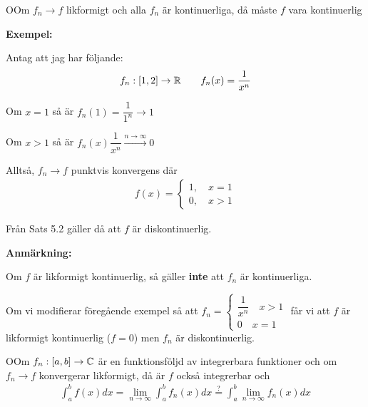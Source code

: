 \par\bigskip
\begin{theo}
  OOm $f_n\to f$ likformigt och alla $f_n$ är kontinuerliga, då måste $f$ vara kontinuerlig
\end{theo}
\newpage
\noindent\textbf{Exempel:}\par
\noindent Antag att jag har följande:
\begin{equation*}
  \begin{gathered}
    f_n:[1,2]\to\mathbb{R}\qquad f_n(x) = \dfrac{1}{x^n}
  \end{gathered}
\end{equation*}
\par\bigskip
\noindent Om $x = 1$ så är $f_n(1) = \dfrac{1}{1^n} \to 1$\par
\noindent Om $x>1$ så är $f_n(x) \dfrac{1}{x^n}\stackrel{n\to\infty}{\to}0$
\par\bigskip
\noindent Alltså, $f_n\to f$ punktvis konvergens där
\begin{equation*}
  \begin{gathered}
    f(x) = 
    \begin{cases*}
      1,\quad x=1\\
      0,\quad x>1
    \end{cases*}
  \end{gathered}
\end{equation*}
\par\bigskip
\noindent Från Sats 5.2 gäller då att $f$ är diskontinuerlig.
\par\bigskip
\noindent\textbf{Anmärkning:}\par
\noindent Om $f$ är likformigt kontinuerlig, så gäller \textbf{inte} att $f_n$ är kontinuerliga.
\par\bigskip
\noindent Om vi modifierar föregående exempel så att $f_n = \begin{cases}\dfrac{1}{x^n}\quad x>1\\0\quad x=1\end{cases}$ får vi att $f$ är likformigt kontinuerlig ($f = 0$) men $f_n$ är diskontinuerlig.
\par\bigskip
\begin{theo}
  OOm $f_n:[a,b]\to\mathbb{C}$ är en funktionsföljd av integrerbara funktioner och om $f_n\to f$ konvergerar likformigt, då är $f$ också integrerbar och
  \begin{equation*}
    \begin{gathered}
      \int_{a}^{b}f(x)dx = \lim_{n\to\infty}\int_{a}^{b}f_n(x)dx \stackrel{?}{=} \int_{a}^{b}\lim_{n\to\infty}f_n(x)dx
    \end{gathered}
  \end{equation*}
\end{theo}
